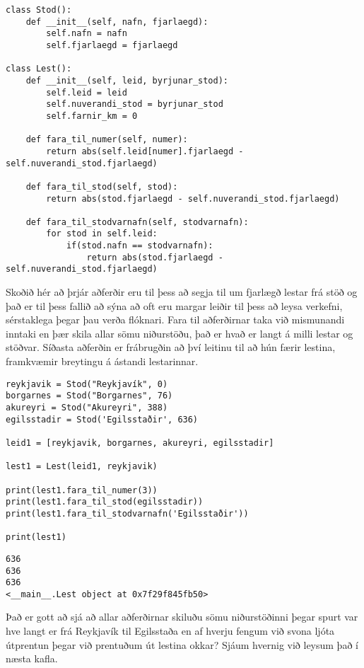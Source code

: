 \begin{lstlisting}[caption=Aðferðir kynntar með lestarkerfi, label=lst:klasar-aðferðir-lestar]
class Stod():
	def __init__(self, nafn, fjarlaegd):
		self.nafn = nafn
		self.fjarlaegd = fjarlaegd
		
class Lest():
	def __init__(self, leid, byrjunar_stod):
		self.leid = leid
		self.nuverandi_stod = byrjunar_stod
		self.farnir_km = 0
	
	def fara_til_numer(self, numer):
		return abs(self.leid[numer].fjarlaegd - self.nuverandi_stod.fjarlaegd)
	
	def fara_til_stod(self, stod):
		return abs(stod.fjarlaegd - self.nuverandi_stod.fjarlaegd)
	
	def fara_til_stodvarnafn(self, stodvarnafn):
		for stod in self.leid:
			if(stod.nafn == stodvarnafn):
				return abs(stod.fjarlaegd - self.nuverandi_stod.fjarlaegd)
\end{lstlisting}

Skoðið hér að þrjár aðferðir eru til þess að segja til um fjarlægð lestar frá stöð og það er til þess fallið að sýna að oft eru margar leiðir til þess að leysa verkefni, sérstaklega þegar þau verða flóknari.
Fara til aðferðirnar taka við mismunandi inntaki en þær skila allar sömu niðurstöðu, það er hvað er langt á milli lestar og stöðvar.
Síðasta aðferðin er frábrugðin að því leitinu til að hún færir lestina, framkvæmir breytingu á ástandi lestarinnar.

\begin{lstlisting}[caption=Tilvik af lestum og stöðvum búin til og notuð, label=lst:klasar-aðferðir-lestar-2]
reykjavik = Stod("Reykjavík", 0)
borgarnes = Stod("Borgarnes", 76)
akureyri = Stod("Akureyri", 388)
egilsstadir = Stod('Egilsstaðir', 636)

leid1 = [reykjavik, borgarnes, akureyri, egilsstadir]

lest1 = Lest(leid1, reykjavik)

print(lest1.fara_til_numer(3))
print(lest1.fara_til_stod(egilsstadir))
print(lest1.fara_til_stodvarnafn('Egilsstaðir'))

print(lest1)
\end{lstlisting}
\lstset{style=uttak}
\begin{lstlisting}
636
636
636
<__main__.Lest object at 0x7f29f845fb50>
\end{lstlisting}
\lstset{style=venjulegt}

Það er gott að sjá að allar aðferðirnar skiluðu sömu niðurstöðinni þegar spurt var hve langt er frá Reykjavík til Egilsstaða en af hverju fengum við svona ljóta útprentun þegar við prentuðum út lestina okkar?
Sjáum hvernig við leysum það í næsta kafla.


